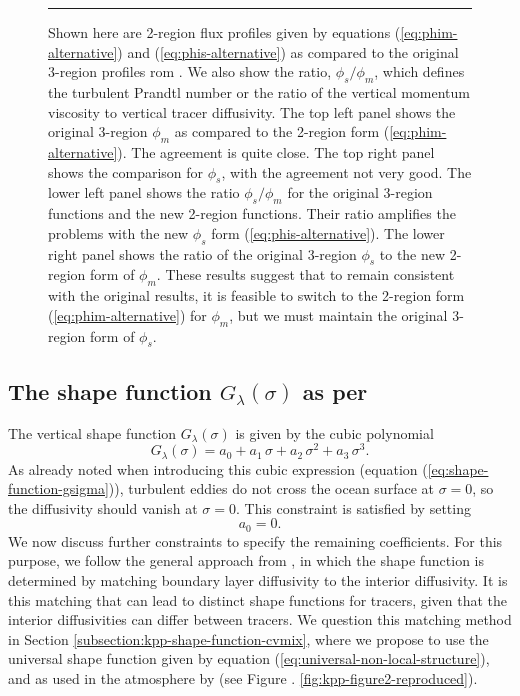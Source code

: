 \begin{figure}[h!t]
\begin{center}
\caption[Alternative similarity functions]{\sf Shown here are 2-region
  flux profiles given by equations (\ref{eq:phim-alternative}) and
  (\ref{eq:phis-alternative}) as compared to the original 3-region
  profiles rom \cite{LargeKPP}.  We also show the ratio,
  $\phi_{s}/\phi_{m}$, which defines the turbulent Prandtl number or
  the ratio of the vertical momentum viscosity to vertical tracer
  diffusivity.  The top left panel shows the original 3-region
  $\phi_{m}$ as compared to the 2-region form
  (\ref{eq:phim-alternative}).  The agreement is quite close.  The top
  right panel shows the comparison for $\phi_{s}$, with the agreement
  not very good. The lower left panel shows the ratio
  $\phi_{s}/\phi_{m}$ for the original 3-region functions and the new
  2-region functions.  Their ratio amplifies the problems with the new
  $\phi_{s}$ form (\ref{eq:phis-alternative}).  The lower right panel
  shows the ratio of the original 3-region $\phi_{s}$ to the new
  2-region form of $\phi_{m}$.  These results suggest that to remain
  consistent with the original \cite{LargeKPP} results, it is feasible
  to switch to the 2-region form (\ref{eq:phim-alternative}) for
  $\phi_{m}$, but we must maintain the original 3-region form of
  $\phi_{s}$.}
\label{fig:phi-alternative-kpp}
\end{center}
\rule{\textwidth}{0.005in}
\end{figure}


\subsection{The shape function $G_{\lambda}(\sigma)$ as per \cite{LargeKPP}}
\label{subsection:kpp-shape-function}

The vertical shape function $G_{\lambda}(\sigma)$ is given by the cubic
polynomial 
\begin{equation}
 G_{\lambda}(\sigma) = a_{0} + a_{1} \, \sigma + a_{2} \, \sigma^{2} + a_{3} \, \sigma^{3}.
\label{eq:shape-function-gsigma-again}
\end{equation}
As already noted when introducing this cubic expression (equation
(\ref{eq:shape-function-gsigma})), turbulent eddies do not cross
the ocean surface at $\sigma=0$, so the diffusivity should vanish at
$\sigma=0$.  This constraint is satisfied by setting
\begin{equation}
 a_{0} = 0.
\end{equation}
We now discuss further constraints to specify the remaining
coefficients.  For this purpose, we follow the general approach from
\cite{LargeKPP}, in which the shape function is determined by matching
boundary layer diffusivity to the interior diffusivity.  It is this
matching that can lead to distinct shape functions for tracers, given
that the interior diffusivities can differ between tracers.  We
question this matching method in Section
\ref{subsection:kpp-shape-function-cvmix}, where we propose to use the
universal shape function given by equation
(\ref{eq:universal-non-local-structure}), and as used in the
atmosphere by \cite{Troen_Mahrt1986} (see Figure .
\ref{fig:kpp-figure2-reproduced}).


